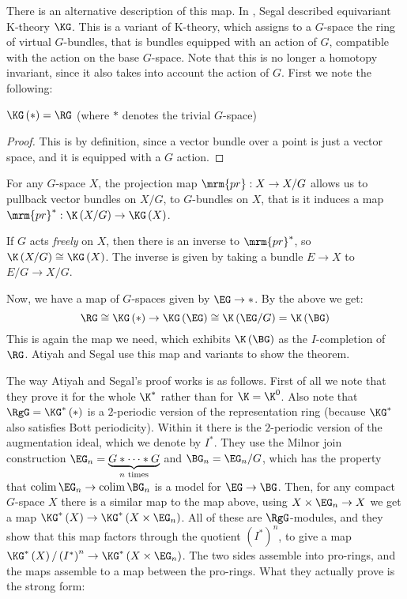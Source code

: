 There is an alternative description of this map.
In \cite{Seg}, Segal described equivariant K-theory $\KG$.
This is a variant of K-theory, which assigns to a $G$-space the ring of virtual $G$-bundles, that is bundles equipped with an action of $G$, compatible with the action on the base $G$-space.
Note that this is no longer a homotopy invariant, since it also takes into account the action of $G$.
First we note the following:

\begin{proposition}
	$\KG\left(*\right) = \RG$ (where $*$ denotes the trivial $G$-space)
\end{proposition}

\begin{proof}
	This is by definition, since a vector bundle over a point is just a vector space, and it is equipped with a $G$ action.
\end{proof}

For any $G$-space $X$, the projection map $\mrm{pr}: X \to X/G$ allows us to pullback vector bundles on $X/G$, to $G$-bundles on $X$, that is it induces a map $\mrm{pr}^*: \K\left(X/G\right) \to \KG\left(X\right)$.

\begin{proposition}
	If $G$ acts \emph{freely} on $X$, then there is an inverse to $\mrm{pr}^*$, so $\K\left(X/G\right) \cong \KG\left(X\right)$.
	The inverse is given by taking a bundle $E \to X$ to $E/G \to X/G$.
\end{proposition}

Now, we have a map of $G$-spaces given by $\EG \to *$.
By the above we get:
$$
\RG
\cong \KG\left(*\right)
\to \KG\left(\EG\right)
\cong \K\left(\EG/G\right)
= \K\left(\BG\right)
$$
This is again the map we need, which exhibits $\K\left(\BG\right)$ as the $I$-completion of $\RG$.
Atiyah and Segal use this map and variants to show the theorem.

The way Atiyah and Segal's proof works is as follows.
First of all we note that they prove it for the whole $\K^*$ rather than for $\K = \K^0$.
Also note that $\RgG = \KG^*\left(*\right)$ is a $2$-periodic version of the representation ring (because $\KG^*$ also satisfies Bott periodicity).
Within it there is the $2$-periodic version of the augmentation ideal, which we denote by $I^*$.
They use the Milnor join construction $\EG_n = \underbrace{G * \cdots * G}_{n \text{ times}}$ and $\BG_n = \EG_n/G$, which has the property that $\colim \EG_n \to \colim \BG_n$ is a model for $\EG \to \BG$.
Then, for any compact $G$-space $X$ there is a similar map to the map above, using $X \times \EG_n \to X$ we get a map $\KG^*\left(X\right) \to \KG^*\left(X \times \EG_n\right)$.
All of these are $\RgG$-modules, and they show that this map factors through the quotient $\left(I^*\right)^n$, to give a map $\KG^*\left(X\right)/\left(I^*\right)^n \to \KG^*\left(X \times \EG_n\right)$.
The two sides assemble into pro-rings, and the maps assemble to a map between the pro-rings.
What they actually prove is the strong form:

